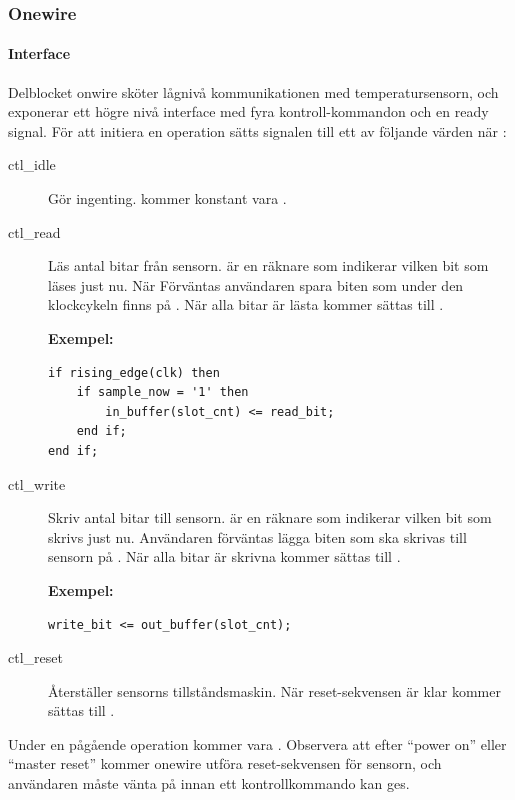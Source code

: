 \documentclass[a4paper]{scrreprt}
\begin{document}
\subsubsection{Onewire}\label{sec:onewire}
\paragraph{Interface}
Delblocket onwire sköter lågnivå kommunikationen med temperatursensorn, och exponerar ett högre nivå interface med fyra kontroll-kommandon och en ready signal. För att initiera en operation sätts  signalen till ett av följande värden när :

\begin{description}
\item[ctl\_idle] Gör ingenting.  kommer konstant vara .

\item[ctl\_read] Läs  antal bitar från sensorn.  är en räknare som indikerar vilken bit som läses just nu. När  Förväntas användaren spara biten som under den klockcykeln finns på . När alla bitar är lästa kommer  sättas till .

\textbf{Exempel:}
\begin{lstlisting}
if rising_edge(clk) then
	if sample_now = '1' then
		in_buffer(slot_cnt) <= read_bit;
	end if;
end if;
\end{lstlisting}


\item[ctl\_write] Skriv  antal bitar till sensorn.  är en räknare som indikerar vilken bit som skrivs just nu. Användaren förväntas lägga biten som ska skrivas till sensorn på .
När alla bitar är skrivna kommer  sättas till .

\textbf{Exempel:}
\begin{lstlisting}
write_bit <= out_buffer(slot_cnt);
\end{lstlisting}

\item[ctl\_reset] Återställer sensorns tillståndsmaskin.
När reset-sekvensen är klar kommer  sättas till .


\end{description}
Under en pågående operation kommer  vara .
Observera att efter ``power on'' eller ``master reset'' kommer onewire utföra reset-sekvensen för sensorn, och användaren måste vänta på  innan ett kontrollkommando kan ges.
\end{document}
